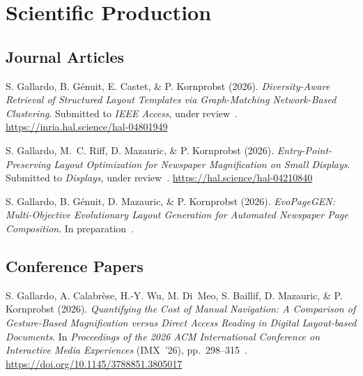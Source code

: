 \documentclass{these-ISSS} %
\begin{document}

\begingroup
\renewcommand{\bibtitle}{}
\fontsize{1pt}{1pt}\selectfont\color{white}
\makeatletter
\renewcommand{\Hy@colorlink}[1]{\begingroup\color{white}}
\makeatother
{}
\endgroup

\newpage
\gdef\chapterTitle{\MakeUppercase{Scientific Production}}
\chapter*{Scientific Production}

\section*{Journal Articles}
\begin{callout}
S. Gallardo, B. G\'enuit, E. Castet, \& P. Kornprobst (2026). \emph{Diversity-Aware Retrieval of Structured Layout Templates via Graph-Matching Network-Based Clustering}. Submitted to \emph{IEEE Access}, under review~. \url{https://inria.hal.science/hal-04801949}

S. Gallardo, M.~C. Riff, D. Mazauric, \& P. Kornprobst (2026). \emph{Entry-Point-Preserving Layout Optimization for Newspaper Magnification on Small Displays}. Submitted to \emph{Displays}, under review~. \url{https://hal.science/hal-04210840}

S. Gallardo, B. G\'enuit, D. Mazauric, \& P. Kornprobst (2026). \emph{EvoPageGEN: Multi-Objective Evolutionary Layout Generation for Automated Newspaper Page Composition}. In preparation~.
\end{callout}

\section*{Conference Papers}
\begin{callout}
S. Gallardo, A. Calabr\`ese, H.-Y. Wu, M. Di~Meo, S. Baillif, D. Mazauric, \& P. Kornprobst (2026). \emph{Quantifying the Cost of Manual Navigation: A Comparison of Gesture-Based Magnification versus Direct Access Reading in Digital Layout-based Documents}. In \emph{Proceedings of the 2026 ACM International Conference on Interactive Media Experiences} (IMX~'26), pp.~298--315~. \url{https://doi.org/10.1145/3788851.3805017} 


\end{callout}
\end{document}
